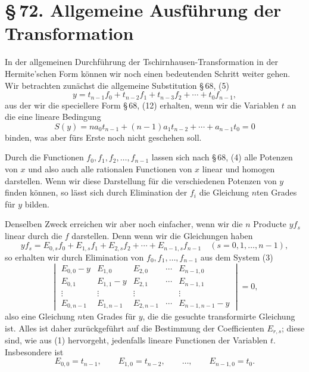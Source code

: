 \documentclass[11pt]{article}
\providecommand{\sect}[2]{\section*{\S\,#1. #2}}
\begin{document}
\sect{72}{Allgemeine Ausführung der Transformation}

In der allgemeinen Durchführung der Tschirnhausen-Transformation in der Hermite'schen Form können wir noch einen bedeutenden Schritt weiter gehen. Wir betrachten zunächst die allgemeine Substitution \S\,68, (5)
\begin{equation}
 y=t_{n-1}f_0+t_{n-2}f_1+t_{n-3}f_2+\cdots+t_0f_{n-1},
\tag{1}
\end{equation}
aus der wir die speciellere Form \S\,68, (12) erhalten, wenn wir die Variablen $t$ an die eine lineare Bedingung
\begin{equation}
 S(y)=na_0t_{n-1}+(n-1)a_1t_{n-2}+\cdots+a_{n-1}t_0=0
\tag{2}
\end{equation}
binden, was aber fürs Erste noch nicht geschehen soll.

Durch die Functionen $f_0,f_1,f_2,\ldots,f_{n-1}$ lassen sich nach \S\,68, (4) alle Potenzen von $x$ und also auch alle rationalen Functionen von $x$ linear und homogen darstellen. Wenn wir diese Darstellung für die verschiedenen Potenzen von $y$ finden können, so lässt sich durch Elimination der $f_i$ die Gleichung $n$ten Grades für $y$ bilden.

Denselben Zweck erreichen wir aber noch einfacher, wenn wir die $n$ Producte $yf_s$ linear durch die $f$ darstellen. Denn wenn wir die Gleichungen haben
\begin{equation}
 yf_s=E_{0,s}f_0+E_{1,s}f_1+E_{2,s}f_2+\cdots+E_{n-1,s}f_{n-1}
 \quad (s=0,1,\ldots,n-1),
\tag{3}
\end{equation}
so erhalten wir durch Elimination von $f_0,f_1,\ldots,f_{n-1}$ aus dem System (3)
\begin{equation}
\begin{vmatrix}
 E_{0,0}-y&E_{1,0}&E_{2,0}&\cdots&E_{n-1,0}\\
 E_{0,1}&E_{1,1}-y&E_{2,1}&\cdots&E_{n-1,1}\\
 \vdots&\vdots&\vdots&&\vdots\\
 E_{0,n-1}&E_{1,n-1}&E_{2,n-1}&\cdots&E_{n-1,n-1}-y
\end{vmatrix}=0,
\tag{4}
\end{equation}
also eine Gleichung $n$ten Grades für $y$, die die gesuchte transformirte Gleichung ist. Alles ist daher zurückgeführt auf die Bestimmung der Coefficienten $E_{r,s}$; diese sind, wie aus (1) hervorgeht, jedenfalls lineare Functionen der Variablen $t$. Insbesondere ist
\begin{equation}
 E_{0,0}=t_{n-1},
 \qquad E_{1,0}=t_{n-2},
 \qquad\ldots,
 \qquad E_{n-1,0}=t_0.
\tag{5}
\end{equation}
\end{document}
